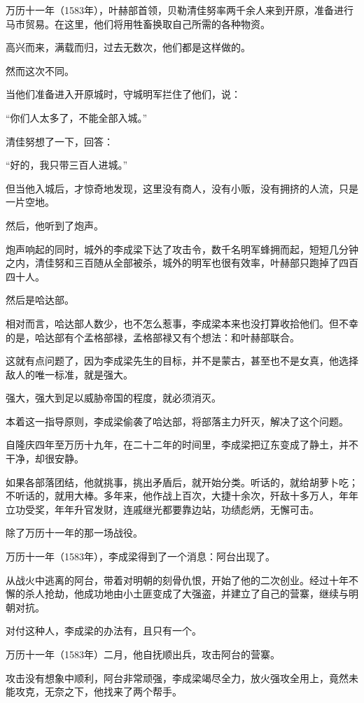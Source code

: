 \begin{multicols}{\theparacolNo}
万历十一年（1583年），叶赫部首领，贝勒清佳努率两千余人来到开原，准备进行马市贸易。在这里，他们将用牲畜换取自己所需的各种物资。

高兴而来，满载而归，过去无数次，他们都是这样做的。

然而这次不同。

当他们准备进入开原城时，守城明军拦住了他们，说：

“你们人太多了，不能全部入城。”

清佳努想了一下，回答：

“好的，我只带三百人进城。”

但当他入城后，才惊奇地发现，这里没有商人，没有小贩，没有拥挤的人流，只是一片空地。

然后，他听到了炮声。

炮声响起的同时，城外的李成梁下达了攻击令，数千名明军蜂拥而起，短短几分钟之内，清佳努和三百随从全部被杀，城外的明军也很有效率，叶赫部只跑掉了四百四十人。

然后是哈达部。

相对而言，哈达部人数少，也不怎么惹事，李成梁本来也没打算收拾他们。但不幸的是，哈达部有个孟格部禄，孟格部禄又有个想法：和叶赫部联合。

这就有点问题了，因为李成梁先生的目标，并不是蒙古，甚至也不是女真，他选择敌人的唯一标准，就是强大。

强大，强大到足以威胁帝国的程度，就必须消灭。

本着这一指导原则，李成梁偷袭了哈达部，将部落主力歼灭，解决了这个问题。

自隆庆四年至万历十九年，在二十二年的时间里，李成梁把辽东变成了静土，并不干净，却很安静。

如果各部落团结，他就挑事，挑出矛盾后，就开始分类。听话的，就给胡萝卜吃；不听话的，就用大棒。多年来，他作战上百次，大捷十余次，歼敌十多万人，年年立功受奖，年年升官发财，连戚继光都要靠边站，功绩彪炳，无懈可击。

除了万历十一年的那一场战役。

万历十一年（1583年），李成梁得到了一个消息：阿台出现了。

从战火中逃离的阿台，带着对明朝的刻骨仇恨，开始了他的二次创业。经过十年不懈的杀人抢劫，他成功地由小土匪变成了大强盗，并建立了自己的营寨，继续与明朝对抗。

对付这种人，李成梁的办法有，且只有一个。

万历十一年（1583年）二月，他自抚顺出兵，攻击阿台的营寨。

攻击没有想象中顺利，阿台非常顽强，李成梁竭尽全力，放火强攻全用上，竟然未能攻克，无奈之下，他找来了两个帮手。


\end{multicols}
